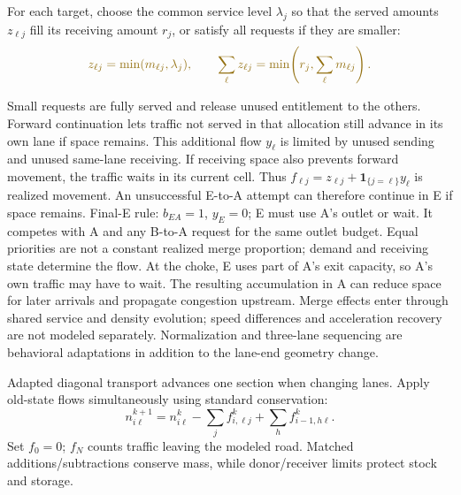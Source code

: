 \documentclass[10pt,a4paper]{article}
\newcommand{\Carey}[1]{\textcolor{SrcCarey}{#1}}
\newcommand{\Own}[1]{\textcolor{Own}{#1}}
\newcommand{\Std}[1]{\textcolor{Standard}{#1}}
\begin{document}
\begin{samepage}
For each target, choose the common service level $\lambda_j$ so that the
served amounts $z_{\ell j}$ fill its receiving amount $r_j$, or satisfy all
requests if they are smaller:
\begin{equation}
 \color{SrcCarey}
 z_{\ell j}=\min(m_{\ell j},\lambda_j),\qquad
 \sum_\ell z_{\ell j}=\min\!\left(r_j,\sum_\ell m_{\ell j}\right).\label{eq:sharing}
\end{equation}
\end{samepage}
Small requests are fully served and release unused entitlement to the others.
\Carey{Forward continuation} lets traffic not served in that allocation
still advance in its own lane if space remains. This additional flow
$y_\ell$ is limited by unused sending and unused same-lane receiving.
If receiving space also prevents forward movement, the traffic waits in
its current cell. Thus
\Own{$f_{\ell j}=z_{\ell j}+\mathbf1_{\{j=\ell\}}y_\ell$} is realized movement.
An unsuccessful E-to-A attempt can therefore continue in E if space remains.
\Own{Final-E rule: $b_{EA}=1$, $y_E=0$}; E must use A's outlet or wait.
It competes with A and any B-to-A request for the same outlet budget.
Equal priorities are not a constant realized merge proportion; demand and
receiving state determine the flow. At the choke, E uses part of A's exit
capacity, so A's own traffic may have to wait. The resulting accumulation
in A can reduce space for later arrivals and propagate congestion upstream.
Merge effects enter through shared service and density evolution; speed
differences and acceleration recovery are not modeled separately.
Normalization and three-lane sequencing are behavioral adaptations in
addition to the lane-end geometry change.

\Carey{Adapted diagonal transport} advances one section when changing lanes.
Apply old-state flows simultaneously using \Std{standard conservation}:
\begin{equation}
 n^{k+1}_{i\ell}=n^k_{i\ell}-\sum_j f^k_{i,\ell j}
                             +\sum_h f^k_{i-1,h\ell}.\label{eq:update}
\end{equation}
Set $f_0=0$; $f_N$ counts traffic leaving the modeled road. Matched additions/subtractions
conserve mass, while donor/receiver limits protect stock and storage.
\end{document}
